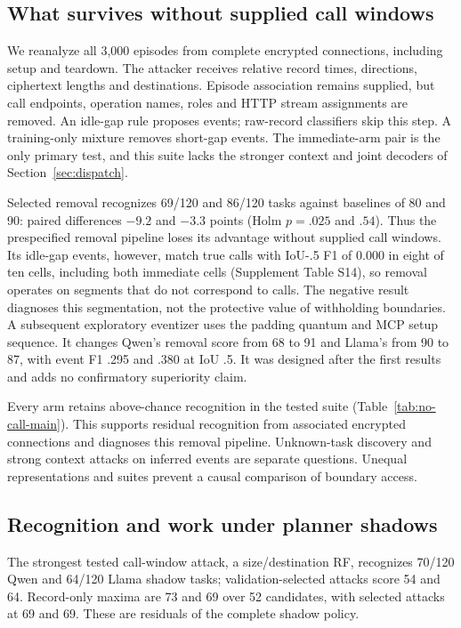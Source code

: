 \subsection{What survives without supplied call windows}\label{sec:noboundary}
We reanalyze all 3,000 episodes from complete encrypted connections, including setup and teardown. The attacker receives relative record times, directions, ciphertext lengths and destinations. Episode association remains supplied, but call endpoints, operation names, roles and HTTP stream assignments are removed. An idle-gap rule proposes events; raw-record classifiers skip this step. A training-only mixture removes short-gap events. The immediate-arm pair is the only primary test, and this suite lacks the stronger context and joint decoders of Section~\ref{sec:dispatch}.

Selected removal recognizes 69/120 and 86/120 tasks against baselines of 80 and 90: paired differences $-9.2$ and $-3.3$ points (Holm $p=.025$ and $.54$). Thus the prespecified removal pipeline loses its advantage without supplied call windows. Its idle-gap events, however, match true calls with IoU-.5 F1 of 0.000 in eight of ten cells, including both immediate cells (Supplement Table S14), so removal operates on segments that do not correspond to calls. The negative result diagnoses this segmentation, not the protective value of withholding boundaries. A subsequent exploratory eventizer uses the padding quantum and MCP setup sequence. It changes Qwen's removal score from 68 to 91 and Llama's from 90 to 87, with event F1 .295 and .380 at IoU .5. It was designed after the first results and adds no confirmatory superiority claim.

Every arm retains above-chance recognition in the tested suite (Table~\ref{tab:no-call-main}). This supports residual recognition from associated encrypted connections and diagnoses this removal pipeline. Unknown-task discovery and strong context attacks on inferred events are separate questions. Unequal representations and suites prevent a causal comparison of boundary access.

\subsection{Recognition and work under planner shadows}\label{sec:shadow}
The strongest tested call-window attack, a size/destination RF, recognizes 70/120 Qwen and 64/120 Llama shadow tasks; validation-selected attacks score 54 and 64. Record-only maxima are 73 and 69 over 52 candidates, with selected attacks at 69 and 69. These are residuals of the complete shadow policy.

